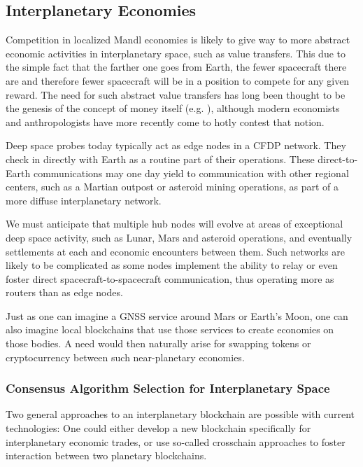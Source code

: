 \documentclass[journal ]{new-aiaa}
\begin{document}
\subsection{Interplanetary Economies}

Competition in localized Mandl economies is likely to give way to more abstract economic activities in interplanetary space, such as value transfers. This due to the simple fact that the farther one goes from Earth, the fewer spacecraft there are and therefore fewer spacecraft will be in a position to compete for any given reward. The need for such abstract value transfers has long been thought to be the genesis of the concept of money itself (e.g. \cite{menger-1892}), although modern economists and anthropologists have more recently come to hotly contest that notion.

Deep space probes today typically act as edge nodes in a CFDP network. They check in directly with Earth as a routine part of their operations. These direct-to-Earth communications may one day yield to communication with other regional centers, such as a Martian outpost or asteroid mining operations, as part of a more diffuse interplanetary network.

We must anticipate that multiple hub nodes will evolve at areas of exceptional deep space activity, such as Lunar, Mars and asteroid operations, and eventually settlements at each and economic encounters between them. Such networks are likely to be complicated as some nodes implement the ability to relay or even foster direct spacecraft-to-spacecraft communication, thus operating more as routers than as edge nodes.

Just as one can imagine a GNSS service around Mars or Earth's Moon, one can also imagine local blockchains that use those services to create economies on those bodies. A need would then naturally arise for swapping tokens or cryptocurrency between such near-planetary economies.

\subsubsection{Consensus Algorithm Selection for Interplanetary Space}

Two general approaches to an interplanetary blockchain are possible with current technologies: One could either develop a new blockchain specifically for interplanetary economic trades, or use so-called crosschain approaches to foster interaction between two planetary blockchains.
\end{document}
